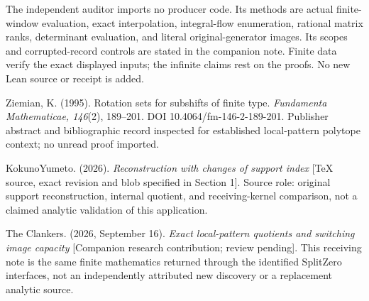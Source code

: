The independent auditor imports no producer code. Its methods are actual finite-window evaluation, exact interpolation, integral-flow enumeration, rational matrix ranks, determinant evaluation, and literal original-generator images. Its scopes and corrupted-record controls are stated in the companion note. Finite data verify the exact displayed inputs; the infinite claims rest on the proofs. No new Lean source or receipt is added.

Ziemian, K. (1995). Rotation sets for subshifts of finite type. \emph{Fundamenta Mathematicae, 146}(2), 189--201. DOI 10.4064/fm-146-2-189-201. Publisher abstract and bibliographic record inspected for established local-pattern polytope context; no unread proof imported.

KokunoYumeto. (2026). \emph{Reconstruction with changes of support index} {[}TeX source, exact revision and blob specified in Section 1{]}. Source role: original support reconstruction, internal quotient, and receiving-kernel comparison, not a claimed analytic validation of this application.

The Clankers. (2026, September 16). \emph{Exact local-pattern quotients and switching image capacity} {[}Companion research contribution; review pending{]}. This receiving note is the same finite mathematics returned through the identified SplitZero interfaces, not an independently attributed new discovery or a replacement analytic source.
